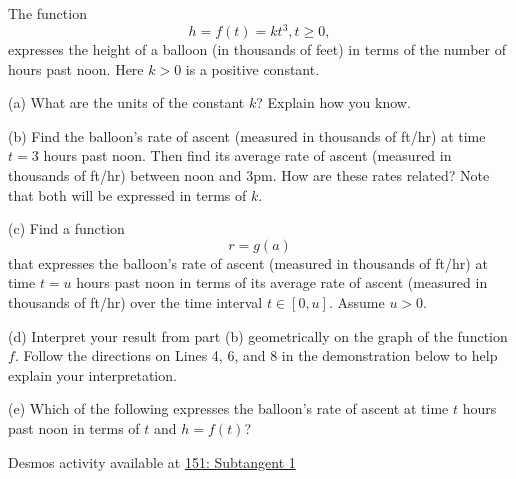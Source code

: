 \documentclass{ximera}
\begin{document}
\begin{question}  \label{Qdgt455t}
The function 
\[
      h = f(t) = kt^3 , t\geq 0 ,
\]
expresses the height of a balloon (in thousands of feet) in terms of the number of hours past noon. Here $k>0$ is a positive constant.

(a) What are the units of the constant $k$? Explain how you know.

(b) Find the balloon's rate of ascent (measured in thousands of ft/hr) at time $t=3$ hours past noon. Then find its average rate of ascent (measured in thousands of ft/hr) between noon and 3pm. How are these rates related? Note that both will be expressed in terms of $k$.

(c) Find a function
\[
     r = g(a)
\]
that expresses the balloon's rate of ascent (measured in thousands of ft/hr) at time $t=u$ hours past noon in terms of  its average rate of ascent (measured in thousands of ft/hr) over the time interval $t\in [0,u]$. Assume $u>0$.

(d) Interpret your result from part (b) geometrically on the graph of the function $f$. Follow the directions on Lines 4, 6, and 8 in the demonstration below to help explain your interpretation.

(e) Which of the following expresses the balloon's rate of ascent at time $t$ hours past noon in terms of $t$ and $h=f(t)$?
\begin{multipleChoice}
\end{multipleChoice}
 

\begin{onlineOnly}
    \begin{center}
\end{center}
\end{onlineOnly}

Desmos activity available at
\href{https://www.desmos.com/calculator/0byjcy77yw}{151: Subtangent 1}


\end{question}
\end{document}

